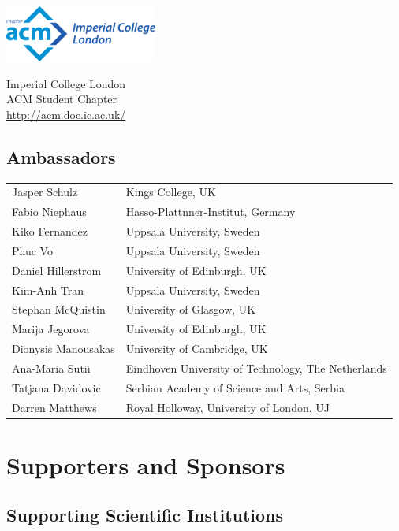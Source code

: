 \documentclass[a4paper,UKenglish]{oasicsmaster-v2016}
\begin{document}
\begin{minipage}{0.45\linewidth}
  \includegraphics[height=5em]{acm-chapter}
\end{minipage}
\begin{minipage}{0.50\linewidth}
  \small
  Imperial College London\\
  ACM Student Chapter\\
  \url{http://acm.doc.ic.ac.uk/}
\end{minipage}
\newpage

\section*{Ambassadors}

\begin{tabularx}{\textwidth}{p{}l}
Jasper Schulz & Kings College, UK \\
Fabio Niephaus  &  Hasso-Plattnner-Institut, Germany \\
Kiko Fernandez  &  Uppsala University, Sweden \\
Phuc Vo   &  Uppsala University, Sweden \\
Daniel Hillerstrom  &  University of Edinburgh, UK \\
Kim-Anh Tran  &  Uppsala University, Sweden \\
Stephan McQuistin  & University of Glasgow, UK \\
Marija Jegorova &  University of Edinburgh, UK \\
Dionysis Manousakas &  University of Cambridge, UK \\
Ana-Maria Sutii &  Eindhoven University of Technology, The Netherlands \\
Tatjana Davidovic &  Serbian Academy of Science and Arts, Serbia \\
Darren Matthews  & Royal Holloway, University of London, UJ \\
\end{tabularx}
\newpage



\chapter{Supporters and Sponsors}

\section*{Supporting Scientific Institutions}
\bigskip
\end{document}
